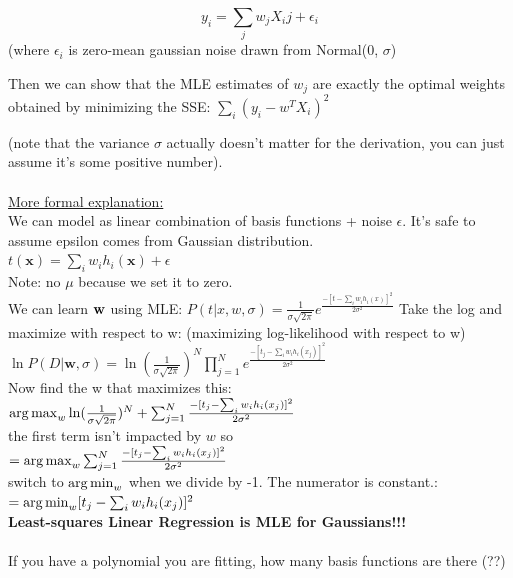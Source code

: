 $$y_i = \sum_j w_j X_ij + \epsilon_i$$
(where $\epsilon_i$ is zero-mean gaussian noise drawn from Normal(0, $\sigma$)

Then we can show that the MLE estimates of $w_j$ are exactly the optimal weights obtained by minimizing the SSE: $\sum_i (y_i - w^T X_i)^2$

(note that the variance $\sigma$ actually doesn't matter for the derivation, you can just assume it's some positive number). \hfill \\ %
\hfill \\
\underline{More formal explanation:} \hfill \\
We can model as linear combination of basis functions + noise $\epsilon$.  
It's safe to assume epsilon comes from Gaussian distribution.  \hfill \\

$t(\bm{x}) = \sum_i w_i h_i(\bm{x}) + \epsilon $ \hfill \\
Note: no $\mu$ because we set it to zero.  \hfill \\

We can learn $\bf{w}$ using MLE: 
$P(t | x, w, \sigma) = \frac{1}{\sigma \sqrt{2 \pi}} e^\frac{-[t - \sum_i w_i h_i(x)]^2}{2 \sigma^2}$
Take the log and maximize with respect to w:  (maximizing log-likelihood with respect to w) \hfill \\
$\displaystyle \ln P(D | \bm{w}, \sigma) = \ln(\frac{1}{\sigma \sqrt{2 \pi}})^N \prod_{j=1}^N e^\frac{-[t_j - \sum_i w_i h_i(x_j)]^2}{2 \sigma^2}$ \hfill \\
Now find the w that maximizes this: \hfill \\
$\operatorname*{arg\,max}_w \ln(\frac{1}{\sigma \sqrt{2 \pi}})^N + \sum_{j=1}^N \frac{-[t_j - \sum_i w_i h_i(x_j)]^2}{2 \sigma^2}$ \hfill \\
the first term isn't impacted by $w$ so  \hfill \\
$= \operatorname*{arg\,max}_w  \sum_{j=1}^N \frac{-[t_j - \sum_i w_i h_i(x_j)]^2}{2 \sigma^2}$ \hfill \\
switch to $\operatorname*{arg\,min}_w$ when we divide by -1.  The numerator is constant.:  \hfill \\
$= \operatorname*{arg\,min}_w  [t_j - \sum_i w_i h_i(x_j)]^2 $ \hfill \\

\textbf{Least-squares Linear Regression is MLE for Gaussians!!!}  \hfill \\ \hfill \\

If you have a polynomial you are fitting, how many basis functions are there (??)  \hfill \\ %


